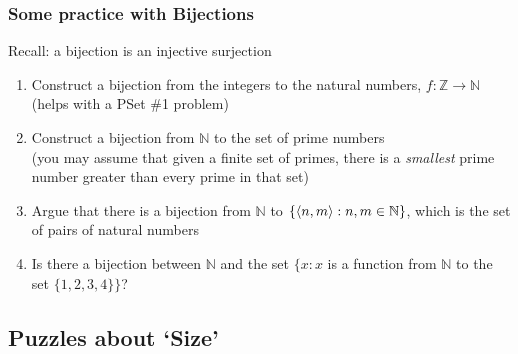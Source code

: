\begin{frame}
\frametitle{Some practice with Bijections}

Recall: a bijection is an injective surjection 

\begin{enumerate}[<+->]



\item Construct a bijection from the integers to the natural numbers, $f: \mathbb{Z} \rightarrow \mathbb{N}$ (helps with a PSet \#1 problem)

\item Construct a bijection from $\mathbb{N}$ to the set of prime numbers \\ (you may assume that given a finite set of primes, there is a \textit{smallest} prime number greater than every prime in that set)

\item Argue that there is a bijection from $\mathbb{N}$ to $\left\{ {\left\langle {n,m} \right\rangle : n,m \in \mathbb{N}} \right\}$, which is the set of pairs of natural numbers

\item Is there a bijection between $\mathbb{N}$ and the set $\{x : x$ is a function from $\mathbb{N}$ to the set $\{1, 2, 3, 4 \} \}$? 



\end{enumerate}
\end{frame}





\subsection{Puzzles about `Size'}


